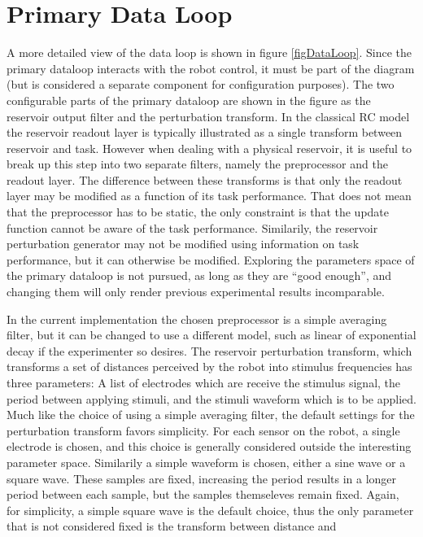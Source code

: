 \section{Primary Data Loop}
A more detailed view of the data loop is shown in figure \ref{figDataLoop}.
Since the primary dataloop interacts with the robot control, it must be part of
the diagram (but is considered a separate component for configuration
purposes).
The two configurable parts of the primary dataloop are shown in the figure as the
reservoir output filter and the perturbation transform.
In the classical RC model the reservoir readout layer is typically illustrated as
a single transform between reservoir and task.
However when dealing with a
physical reservoir, it is useful to break up this step into two separate filters,
namely the preprocessor and the readout layer.
The difference between these transforms is that only the readout layer may be
modified as a function of its task performance.
That does not mean that the preprocessor has to be static, the only constraint is
that the update function cannot be aware of the task performance.
Similarily, the reservoir perturbation generator may not be modified using
information on task performance, but it can otherwise be modified.
Exploring the parameters space of the primary dataloop is not pursued, as
long as they are ``good enough'', and changing them will only render previous
experimental results incomparable.
\par
In the current implementation the chosen preprocessor is a simple averaging
filter, but it can be changed to use a different model, such as linear of
exponential decay if the experimenter so desires.
The reservoir perturbation transform, which transforms a
set of distances perceived by the robot into stimulus frequencies has three
parameters: A list of electrodes which are receive the 
stimulus signal, the period between applying stimuli, and the stimuli waveform
which is to be applied.
Much like the choice of using a simple averaging filter, the default settings
for the perturbation transform favors simplicity.
For each sensor on the robot, a single electrode is chosen, and this choice is
generally considered outside the interesting parameter space.
Similarily a simple waveform is chosen, either a sine wave or a square wave.
These samples are fixed, increasing the period results in a longer
period between each sample, but the samples themseleves remain fixed.
Again, for simplicity, a simple square wave is the default choice, thus the only
parameter that is not considered fixed is the transform between distance and
